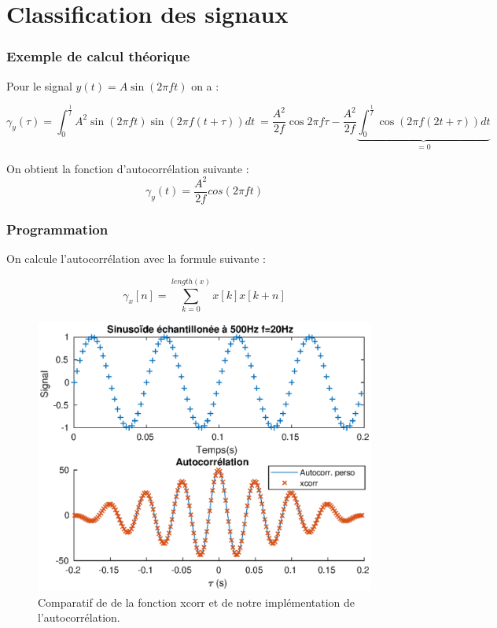 \documentclass[french]{article}
\begin{document}
\FloatBarrier
\newpage
\part{ Classification des signaux}

\section{ Exemple de calcul théorique}

Pour le signal $y(t) = A \sin(2 \pi f t)$ on a :

\[
\gamma_y(\tau) = \int_0^{\frac{1}{f}} A^2 \sin(2\pi f t) \sin(2 \pi f (t+\tau)) dt \
= \frac{A^2}{2f} \cos 2\pi f \tau - \frac{A^2}{2f}\underbrace{\int_0^{\frac{1}{f}} \cos (2 \pi f (2t + \tau)) dt}_{=0}
\]

On obtient la fonction d'autocorrélation suivante :
\[
\gamma_y (t) = \frac{A^2} {2f} cos(2 \pi f t)
\]

\section{ Programmation}

On calcule l'autocorrélation avec la formule suivante :

\[
\gamma_x [n] = \sum_{k = 0} ^{length (x)} x[k]x[k+n]
\]

\begin{figure}[h!]
	\centering
	\includegraphics{images/autocorr.eps}
	\caption{Comparatif de de la fonction xcorr et de notre implémentation de l'autocorrélation.}
	\label{autocorr}
\end{figure}
\end{document}

